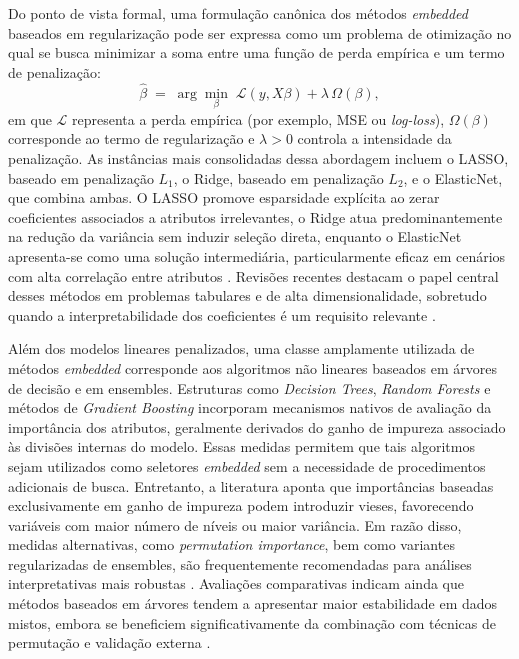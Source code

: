 Do ponto de vista formal, uma formulação canônica dos métodos \textit{embedded} baseados em regularização pode ser expressa como um problema de otimização no qual se busca minimizar a soma entre uma função de perda empírica e um termo de penalização:
\[
\widehat{\beta} \;=\; \arg\min_{\beta}\; \mathcal{L}(y, X\beta) + \lambda\,\Omega(\beta),
\]
em que $\mathcal{L}$ representa a perda empírica (por exemplo, MSE ou \textit{log-loss}), $\Omega(\beta)$ corresponde ao termo de regularização e $\lambda>0$ controla a intensidade da penalização. As instâncias mais consolidadas dessa abordagem incluem o LASSO, baseado em penalização $L_1$, o Ridge, baseado em penalização $L_2$, e o ElasticNet, que combina ambas. O LASSO promove esparsidade explícita ao zerar coeficientes associados a atributos irrelevantes, o Ridge atua predominantemente na redução da variância sem induzir seleção direta, enquanto o ElasticNet apresenta-se como uma solução intermediária, particularmente eficaz em cenários com alta correlação entre atributos \cite{Theng2024,10.1007/978-3-031-23092-9_12,Dhal2022}. Revisões recentes destacam o papel central desses métodos em problemas tabulares e de alta dimensionalidade, sobretudo quando a interpretabilidade dos coeficientes é um requisito relevante \cite{BARBIERI2024123667,KHAIRE20221060}.

Além dos modelos lineares penalizados, uma classe amplamente utilizada de métodos \textit{embedded} corresponde aos algoritmos não lineares baseados em árvores de decisão e em ensembles. Estruturas como \textit{Decision Trees}, \textit{Random Forests} e métodos de \textit{Gradient Boosting} incorporam mecanismos nativos de avaliação da importância dos atributos, geralmente derivados do ganho de impureza associado às divisões internas do modelo. Essas medidas permitem que tais algoritmos sejam utilizados como seletores \textit{embedded} sem a necessidade de procedimentos adicionais de busca. Entretanto, a literatura aponta que importâncias baseadas exclusivamente em ganho de impureza podem introduzir vieses, favorecendo variáveis com maior número de níveis ou maior variância. Em razão disso, medidas alternativas, como \textit{permutation importance}, bem como variantes regularizadas de ensembles, são frequentemente recomendadas para análises interpretativas mais robustas \cite{SolorioFernandez2020,SolorioFernandez2022,EBRAHIMIWARKIANI2025129372,Theng2024}. Avaliações comparativas indicam ainda que métodos baseados em árvores tendem a apresentar maior estabilidade em dados mistos, embora se beneficiem significativamente da combinação com técnicas de permutação e validação externa \cite{Bouchlaghem2022,Emmoh2024}.

